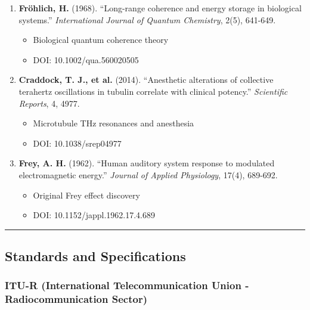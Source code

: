 \begin{enumerate}
\def\labelenumi{\arabic{enumi}.}
\setcounter{enumi}{22}
\tightlist
\item
  \textbf{Fr\"{o}hlich, H.} (1968). ``Long-range
  coherence and energy storage in biological systems.''
  \emph{International Journal of Quantum Chemistry}, 2(5), 641-649.

  \begin{itemize}
  \tightlist
  \item
    Biological quantum coherence theory
  \item
    DOI: 10.1002/qua.560020505
  \end{itemize}
\item
  \textbf{Craddock, T. J., et al.} (2014). ``Anesthetic alterations of
  collective terahertz oscillations in tubulin correlate with clinical
  potency.'' \emph{Scientific Reports}, 4, 4977.

  \begin{itemize}
  \tightlist
  \item
    Microtubule THz resonances and anesthesia
  \item
    DOI: 10.1038/srep04977
  \end{itemize}
\item
  \textbf{Frey, A. H.} (1962). ``Human auditory system response to
  modulated electromagnetic energy.'' \emph{Journal of Applied
  Physiology}, 17(4), 689-692.

  \begin{itemize}
  \tightlist
  \item
    Original Frey effect discovery
  \item
    DOI: 10.1152/jappl.1962.17.4.689
  \end{itemize}
\end{enumerate}

\begin{center}\rule{0.5\linewidth}{0.5pt}\end{center}

\subsection{\texorpdfstring{Standards and Specifications}{Standards and Specifications}}\label{standards-and-specifications}

\subsubsection{ITU-R (International Telecommunication Union -
Radiocommunication
Sector)}\label{itu-r-international-telecommunication-union---radiocommunication-sector}

